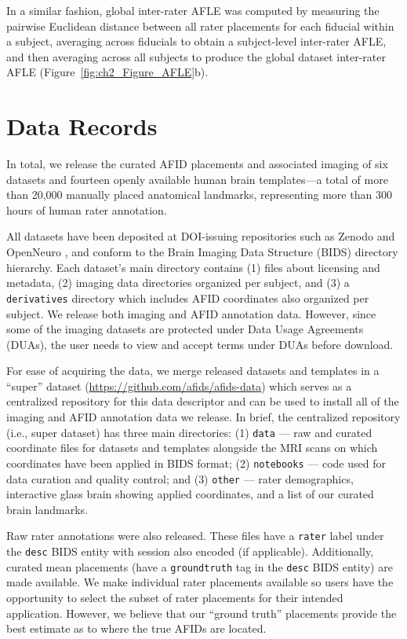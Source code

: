 In a similar fashion, global inter-rater AFLE was computed by measuring the pairwise Euclidean distance between all rater placements for each fiducial within a subject, averaging across fiducials to obtain a subject-level inter-rater AFLE, and then averaging across all subjects to produce the global dataset inter-rater AFLE (Figure~\ref{fig:ch2_Figure_AFLE}b).

\section{Data Records}

In total, we release the curated AFID placements and associated imaging of six datasets and fourteen openly available human brain templates—a total of more than 20,000 manually placed anatomical landmarks, representing more than 300 hours of human rater annotation.

All datasets have been deposited at DOI-issuing repositories such as Zenodo and OpenNeuro \cite{Taha2023-lt, Lau2023-db, Lau2023-op, Abbass2023-yl}, and conform to the Brain Imaging Data Structure (BIDS) directory hierarchy. Each dataset’s main directory contains (1) files about licensing and metadata, (2) imaging data directories organized per subject, and (3) a \texttt{derivatives} directory which includes AFID coordinates also organized per subject. We release both imaging and AFID annotation data. However, since some of the imaging datasets are protected under Data Usage Agreements (DUAs), the user needs to view and accept terms under DUAs before download.

For ease of acquiring the data, we merge released datasets and templates in a “super” dataset (\url{https://github.com/afids/afids-data}) which serves as a centralized repository for this data descriptor and can be used to install all of the imaging and AFID annotation data we release. In brief, the centralized repository (i.e., super dataset) has three main directories: (1) \texttt{data} — raw and curated coordinate files for datasets and templates alongside the MRI scans on which coordinates have been applied in BIDS format; (2) \texttt{notebooks} — code used for data curation and quality control; and (3) \texttt{other} — rater demographics, interactive glass brain showing applied coordinates, and a list of our curated brain landmarks.

Raw rater annotations were also released. These files have a \texttt{rater} label under the \texttt{desc} BIDS entity with session also encoded (if applicable). Additionally, curated mean placements (have a \texttt{groundtruth} tag in the \texttt{desc} BIDS entity) are made available. We make individual rater placements available so users have the opportunity to select the subset of rater placements for their intended application. However, we believe that our “ground truth” placements provide the best estimate as to where the true AFIDs are located.

